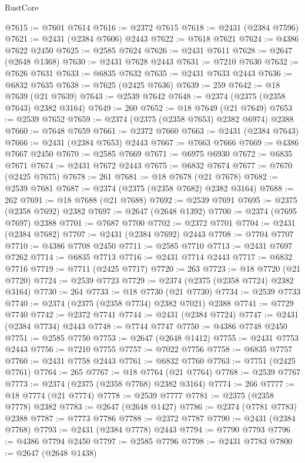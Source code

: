 \begin{lexlean}{RustCore}
\begin{coremodule}
@7615 := @7601 @7614
@7616 := @2372 @7615
@7618 := @2431 (@2384 @7596)
@7621 := @2431 (@2384 @7606) @2443
@7622 := @7618 @7621
@7624 := @4386 @7622 @2450
@7625 := @2585 @7624
@7626 := @2431 @7611
@7628 := @2647 (@2648 @1368)
@7630 := @2431 @7628 @2443
@7631 := @7210 @7630
@7632 := @7626 @7631
@7633 := @6835 @7632
@7635 := @2431 @7633 @2443
@7636 := @6832 @7635
@7638 := @7625 (@2425 @7636)
@7639 := 259
@7642 := @18 @7639 (@21 @7639)
@7643 := @2539 @7642
@7648 := @2374 (@2375 (@2358 @7643) @2382 @3164)
@7649 := 260
@7652 := @18 @7649 (@21 @7649)
@7653 := @2539 @7652
@7659 := @2374 (@2375 (@2358 @7653) @2382 @6974) @2388
@7660 := @7648 @7659
@7661 := @2372 @7660
@7663 := @2431 (@2384 @7643)
@7666 := @2431 (@2384 @7653) @2443
@7667 := @7663 @7666
@7669 := @4386 @7667 @2450
@7670 := @2585 @7669
@7671 := @6975 @6930
@7672 := @6835 @7671
@7674 := @2431 @7672 @2443
@7675 := @6832 @7674
@7677 := @7670 (@2425 @7675)
@7678 := 261
@7681 := @18 @7678 (@21 @7678)
@7682 := @2539 @7681
@7687 := @2374 (@2375 (@2358 @7682) @2382 @3164)
@7688 := 262
@7691 := @18 @7688 (@21 @7688)
@7692 := @2539 @7691
@7695 := @2375 (@2358 @7692) @2382
@7697 := @2647 (@2648 @1392)
@7700 := @2374 (@7695 @7697) @2388
@7701 := @7687 @7700
@7702 := @2372 @7701
@7704 := @2431 (@2384 @7682)
@7707 := @2431 (@2384 @7692) @2443
@7708 := @7704 @7707
@7710 := @4386 @7708 @2450
@7711 := @2585 @7710
@7713 := @2431 @7697 @7262
@7714 := @6835 @7713
@7716 := @2431 @7714 @2443
@7717 := @6832 @7716
@7719 := @7711 (@2425 @7717)
@7720 := 263
@7723 := @18 @7720 (@21 @7720)
@7724 := @2539 @7723
@7729 := @2374 (@2375 (@2358 @7724) @2382 @3164)
@7730 := 264
@7733 := @18 @7730 (@21 @7730)
@7734 := @2539 @7733
@7740 := @2374 (@2375 (@2358 @7734) @2382 @7021) @2388
@7741 := @7729 @7740
@7742 := @2372 @7741
@7744 := @2431 (@2384 @7724)
@7747 := @2431 (@2384 @7734) @2443
@7748 := @7744 @7747
@7750 := @4386 @7748 @2450
@7751 := @2585 @7750
@7753 := @2647 (@2648 @1412)
@7755 := @2431 @7753 @2443
@7756 := @7210 @7755
@7757 := @7022 @7756
@7758 := @6835 @7757
@7760 := @2431 @7758 @2443
@7761 := @6832 @7760
@7763 := @7751 (@2425 @7761)
@7764 := 265
@7767 := @18 @7764 (@21 @7764)
@7768 := @2539 @7767
@7773 := @2374 (@2375 (@2358 @7768) @2382 @3164)
@7774 := 266
@7777 := @18 @7774 (@21 @7774)
@7778 := @2539 @7777
@7781 := @2375 (@2358 @7778) @2382
@7783 := @2647 (@2648 @1427)
@7786 := @2374 (@7781 @7783) @2388
@7787 := @7773 @7786
@7788 := @2372 @7787
@7790 := @2431 (@2384 @7768)
@7793 := @2431 (@2384 @7778) @2443
@7794 := @7790 @7793
@7796 := @4386 @7794 @2450
@7797 := @2585 @7796
@7798 := @2431 @7783
@7800 := @2647 (@2648 @1438)

\end{coremodule}
\end{lexlean}
